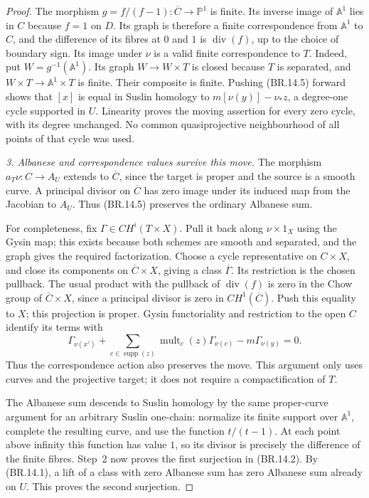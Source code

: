 \begin{proof}
The morphism \(g=f/(f-1):\overline C\to\mathbb P^1\) is
finite.  Its inverse image of \(\mathbb A^1\) lies in \(C\)
because \(f=1\) on \(D\).  Its graph is therefore a finite
correspondence from \(\mathbb A^1\) to \(C\), and the
difference of its fibres at \(0\) and \(1\) is
\(\operatorname{div}(f)\), up to the choice of boundary sign.
Its image under \(\nu\) is a valid finite correspondence to
\(T\).  Indeed, put \(W=g^{-1}(\mathbb A^1)\).  Its graph
\(W\to W\times T\) is closed because \(T\) is separated,
and \(W\times T\to\mathbb A^1\times T\) is finite.
Their composite is finite.  Pushing (BR.14.5) forward shows that \([x]\)
is equal in Suslin homology to \(m[\nu(y)]-\nu_*z\), a
degree-one cycle supported in \(U\).
Linearity proves the moving assertion for every zero cycle,
with its degree unchanged.  No common quasiprojective
neighbourhood of all points of that cycle was used.

\emph{3. Albanese and correspondence values survive this move.}
The morphism \(a_T\nu:C\to A_U\) extends to
\(\overline C\), since the target is proper and the source
is a smooth curve.  A principal divisor on \(\overline C\)
has zero image under its induced map from the Jacobian to
\(A_U\).  Thus (BR.14.5) preserves the ordinary Albanese sum.

For completeness, fix \(\Gamma\in CH^i(T\times X)\).
Pull it back along \(\nu\times1_X\) using the Gysin map;
this exists because both schemes are smooth and separated,
and the graph gives the required factorization.  Choose a
cycle representative on \(C\times X\), and close its
components on \(\overline C\times X\), giving a class
\(\overline\Gamma\).  Its restriction is the chosen pullback.
The usual product with the pullback of
\(\operatorname{div}(f)\) is zero in the Chow group of
\(\overline C\times X\), since a principal divisor is zero
in \(CH^1(\overline C)\).  Push this equality to \(X\);
this projection is proper.  Gysin functoriality and restriction
to the open \(C\) identify its terms with
\[
       \Gamma_{\nu(x')}+
       \sum_{c\in\operatorname{supp}(z)}\operatorname{mult}_c(z)
                   \Gamma_{\nu(c)}-m\Gamma_{\nu(y)}=0.
                                                               \tag{BR.14.6}
\]
Thus the correspondence action also preserves the move.
This argument only uses curves and the projective target;
it does not require a compactification of \(T\).

The Albanese sum descends to Suslin homology by the same
proper-curve argument for an arbitrary Suslin one-chain:
normalize its finite support over \(\mathbb A^1\), complete
the resulting curve, and use the function \(t/(t-1)\).
At each point above infinity this function has value \(1\),
so its divisor is precisely the difference of the finite
fibres.  Step~2 now proves the first surjection in
(BR.14.2).  By (BR.14.1), a lift of a class with zero
Albanese sum has zero Albanese sum already on \(U\).
This proves the second surjection.


\end{proof}
